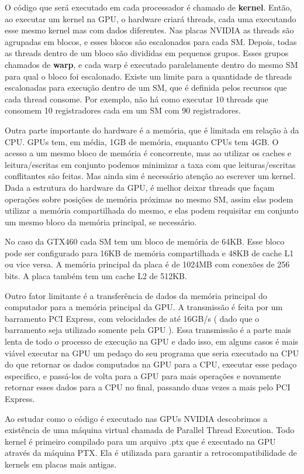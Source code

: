 O código que será executado em cada processador é chamado de \textbf{kernel}. Então, ao executar um kernel na GPU, o 
hardware criará threads, cada uma executando esse mesmo kernel mas com dados diferentes. Nas placas NVIDIA as threads 
são agrupadas em blocos, e esses blocos são escalonados para cada SM. Depois, todas as threads dentro de um bloco são 
divididas em pequenos grupos. Esses grupos chamados de \textbf{warp}, e cada warp é executado paralelamente dentro do 
mesmo SM para qual o bloco foi escalonado. Existe um limite para a quantidade de threads escalonadas para execução
dentro de um SM, que é definida pelos recursos que cada thread consome. Por exemplo, não há como executar 10 threads
que consomem 10 registradores cada em um SM com 90 registradores.

Outra parte importante do hardware é a memória, que é limitada em relação à da CPU. GPUs tem, em média, 1GB
de memória, enquanto CPUs tem 4GB. O acesso a um mesmo bloco de memória é concorrente, mas ao utilizar os caches e leitura/escritas em
conjunto podemos minimizar a taxa com que leituras/escritas conflitantes são feitas. Mas ainda sim é necessário atenção ao escrever um
kernel. Dada a estrutura do hardware da GPU, é melhor deixar threads que façam operações sobre posições de memória próximas no mesmo
SM, assim elas podem utilizar a memória compartilhada do mesmo, e elas podem requisitar em conjunto um mesmo bloco da memória principal,
se necessário.

No caso da GTX460 cada SM tem um bloco de memória de 64KB. Esse bloco pode ser configurado para 16KB de memória compartilhada e 48KB
de cache L1 ou vice versa. A memória principal da placa é de 1024MB com conexões de 256 bits. A placa também tem um
cache L2 de 512KB.

Outro fator limitante é a transferência de dados da memória principal do computador para a memória 
principal da GPU. A transmissão é feita por um barramento PCI Express, com velocidades de até 16GB/s ( dado que o
barramento seja utilizado somente pela GPU ). Essa transmissão é a parte mais lenta de todo o
processo de execução na GPU e dado isso, em alguns casos é mais viável executar na GPU um pedaço do seu programa que seria executado
na CPU do que retornar os dados computados na GPU para a CPU, executar esse pedaço especifico, e passá-los de volta para a GPU 
para mais operações e novamente retornar esses dados para a CPU no final, passando duas vezes a mais pelo PCI Express. 

Ao estudar como o código é executado nas GPUs NVIDIA descobrimos a existência de uma máquina virtual chamada de Parallel Thread Execution.
Todo kernel é primeiro compilado para um arquivo .ptx que é executado na GPU através da máquina PTX. Ela é utilizada para garantir 
a retrocompatibilidade de kernels em placas mais antigas.

